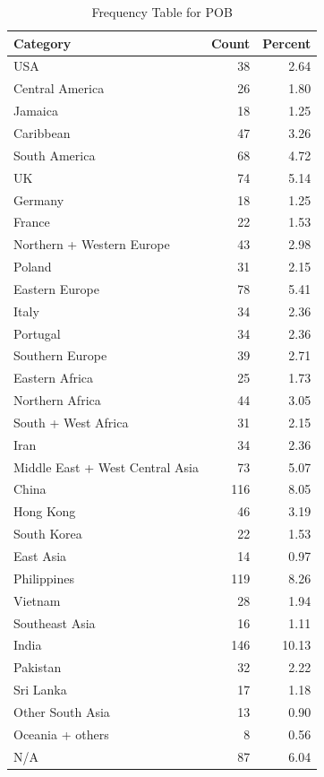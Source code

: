 \begin{table}[!h]
\centering
\caption{\label{tab:tab:POB}Frequency Table for POB}
\centering
\begin{tabular}[t]{lrr}
\toprule
Category & Count & Percent\\
\midrule
USA & 38 & 2.64\\
Central America & 26 & 1.80\\
Jamaica & 18 & 1.25\\
Caribbean & 47 & 3.26\\
South America & 68 & 4.72\\
\addlinespace
UK & 74 & 5.14\\
Germany & 18 & 1.25\\
France & 22 & 1.53\\
Northern + Western Europe & 43 & 2.98\\
Poland & 31 & 2.15\\
\addlinespace
Eastern Europe & 78 & 5.41\\
Italy & 34 & 2.36\\
Portugal & 34 & 2.36\\
Southern Europe & 39 & 2.71\\
Eastern Africa & 25 & 1.73\\
\addlinespace
Northern Africa & 44 & 3.05\\
South + West Africa & 31 & 2.15\\
Iran & 34 & 2.36\\
Middle East + West Central Asia & 73 & 5.07\\
China & 116 & 8.05\\
\addlinespace
Hong Kong & 46 & 3.19\\
South Korea & 22 & 1.53\\
East Asia & 14 & 0.97\\
Philippines & 119 & 8.26\\
Vietnam & 28 & 1.94\\
\addlinespace
Southeast Asia & 16 & 1.11\\
India & 146 & 10.13\\
Pakistan & 32 & 2.22\\
Sri Lanka & 17 & 1.18\\
Other South Asia & 13 & 0.90\\
\addlinespace
Oceania + others & 8 & 0.56\\
N/A & 87 & 6.04\\
\bottomrule
\end{tabular}
\end{table}
